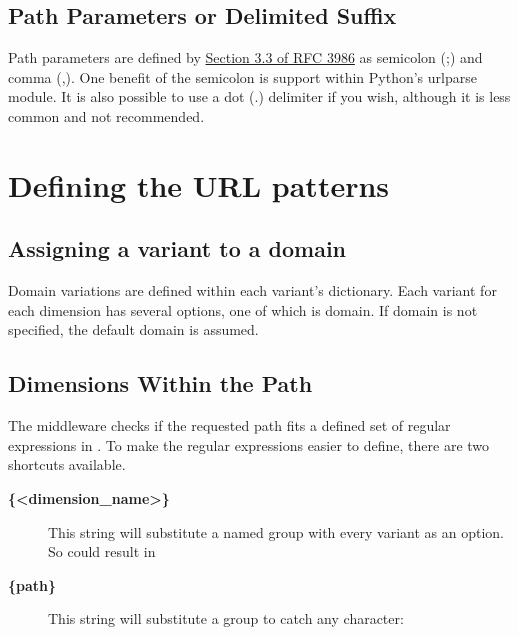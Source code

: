 \documentclass[letterpaper,10pt,english]{sphinxmanual}
\begin{document}
\subsection{Path Parameters or Delimited Suffix}
\label{variations_and_urls:path-parameters-or-delimited-suffix}
Path parameters are defined by
\href{http://tools.ietf.org/html/rfc3986\#section-3.3}{Section 3.3 of RFC 3986}
as semicolon (;) and comma (,). One benefit of the semicolon is support within Python's urlparse module. It is also possible to use a dot (.) delimiter if you wish, although it is less common and not recommended.


\section{Defining the URL patterns}
\label{variations_and_urls:defining-the-url-patterns}

\subsection{Assigning a variant to a domain}
\label{variations_and_urls:assigning-a-variant-to-a-domain}
Domain variations are defined within each variant's dictionary. Each variant for each dimension has several options, one of which is domain. If domain is not specified, the default domain is assumed.


\subsection{Dimensions Within the Path}
\label{variations_and_urls:dimensions-within-the-path}
The middleware checks if the requested path fits a defined set of regular expressions in . To make the regular expressions easier to define, there are two shortcuts available.
\begin{description}
\item[{\textbf{\{\textless{}dimension\_name\textgreater{}\}}}] \leavevmode
This string will substitute a named group with every variant as an option. So  could result in 

\item[{\textbf{\{path\}}}] \leavevmode
This string will substitute a group to catch any character: 

\end{description}
\end{document}
